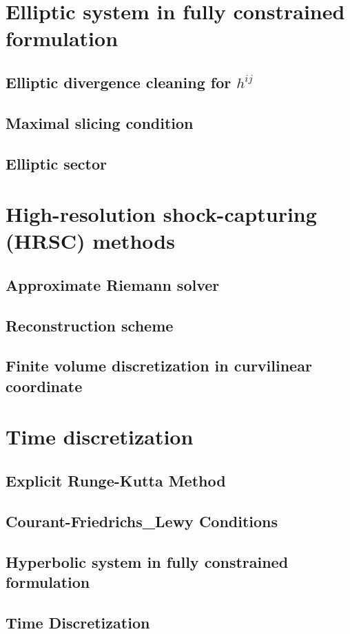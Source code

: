 \section{Elliptic system in fully constrained formulation} %
\subsection{Elliptic divergence cleaning for $h^{ij}$}
\subsection{Maximal slicing condition}
\subsection{Elliptic sector}

\section{High-resolution shock-capturing (HRSC) methods}
\subsection{Approximate Riemann solver}
\subsection{Reconstruction scheme}
\subsection{Finite volume discretization in curvilinear coordinate}

\section{Time discretization}
\subsection{Explicit Runge-Kutta Method}
\subsection{Courant-Friedrichs_Lewy Conditions}
\subsection{Hyperbolic system in fully constrained formulation}

\subsection{Time Discretization} %
\label{section3.2.2}

